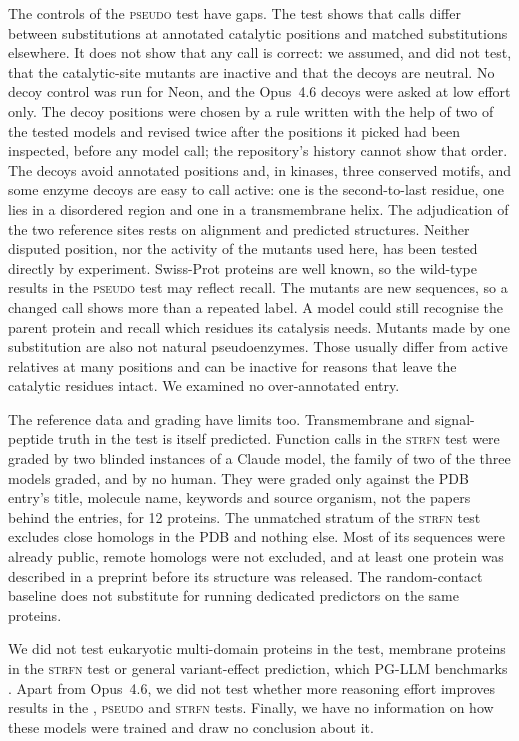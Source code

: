 \documentclass[11pt]{article}
\newcommand{\tpseudo}{\textmd{\textsc{pseudo}}}\newcommand{\tstrfn}{\textmd{\textsc{strfn}}}
\begin{document}
The controls of the \tpseudo{} test have gaps. The test shows that calls differ between substitutions
at annotated catalytic positions and matched substitutions elsewhere. It does not show that any call is
correct: we assumed, and did not test, that the catalytic-site mutants are inactive and that the decoys
are neutral. No decoy control was run for Neon, and the Opus~4.6 decoys
were asked at low effort only. The decoy positions were chosen by a rule written with the help of two of
the tested models and revised twice after the positions it picked had been inspected, before any model call;
the repository's history cannot show that order. The decoys avoid annotated positions and, in kinases, three
conserved motifs, and some enzyme decoys
are easy to call active: one is the second-to-last residue, one lies in a disordered region and one in a
transmembrane helix. The adjudication of the two reference sites rests
on alignment and predicted structures. Neither disputed position, nor the activity of the mutants used
here, has been tested directly by experiment. Swiss-Prot proteins are well known, so the wild-type
results in the \tpseudo{} test may reflect recall. The mutants are new sequences, so a changed call shows more than a repeated label. A model could
still recognise the parent protein and recall which residues its catalysis needs. Mutants made by one
substitution are also not natural pseudoenzymes. Those usually differ from active relatives at many
positions and can be inactive for reasons that leave the catalytic residues intact. We examined no
over-annotated entry.

The reference data and grading have limits too. Transmembrane and signal-peptide truth in the \tfeat{} test is
itself predicted. Function calls in the \tstrfn{} test were graded by two blinded instances of a Claude model, the
family of two of the three models graded, and by no human. They were graded only against the PDB entry's title, molecule name, keywords and source organism, not the
papers behind the entries, for
12 proteins. The unmatched
stratum of the \tstrfn{} test excludes close homologs in the PDB and nothing else. Most of its sequences were already
public, remote homologs were not excluded, and at least one protein was described in a preprint before
its structure was released. The random-contact baseline does not substitute for running dedicated
predictors on the same proteins.

We did not test eukaryotic multi-domain proteins in the \tfeat{} test, membrane proteins in the \tstrfn{} test or general
variant-effect prediction, which PG-LLM benchmarks \citep{arora2026pgllm}. Apart from Opus~4.6, we did not test whether more reasoning effort improves results
in the \tfeat, \tpseudo{} and \tstrfn{} tests. Finally, we have no information on how these models were trained and draw no conclusion
about it.
\end{document}
